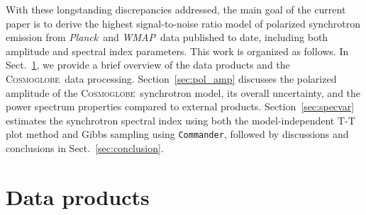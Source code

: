 \documentclass[twocolumn]{../../common/aa}
\def\WMAP{\emph{WMAP}}
\def\Planck{\emph{Planck}}
\def\commander{\texttt{Commander}}
\newcommand{\cosmoglobe}{\textsc{Cosmoglobe}}
\begin{document}
With these longstanding discrepancies addressed, the main goal of the current paper is to derive the highest signal-to-noise ratio model of polarized synchrotron emission from \Planck\ and \WMAP\ data published to date, including both amplitude and spectral index parameters. This work is organized as follows. In Sect.~\ref{sec:data}, we provide a brief overview of the data products and the \cosmoglobe\ data processing. Section~\ref{sec:pol_amp} discusses the polarized amplitude of the \cosmoglobe\ synchrotron model, its overall uncertainty, and the power spectrum properties compared to external products. Section~\ref{sec:specvar} estimates the synchrotron spectral index using both the model-independent T-T plot method and Gibbs sampling using \commander, followed by discussions and conclusions in Sect.~\ref{sec:conclusion}.







\section{Data products}
\label{sec:data}
\end{document}

